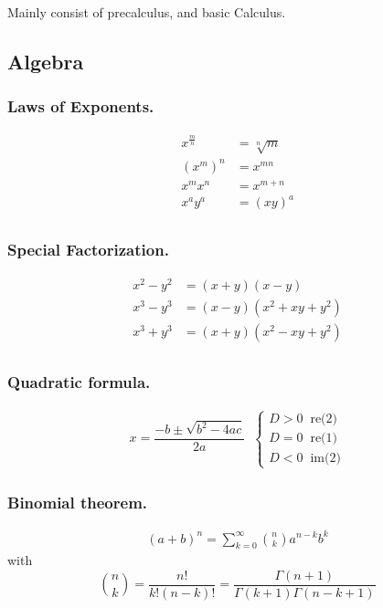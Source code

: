 \documentclass[../main.tex]{subfiles}
\begin{document}
Mainly consist of precalculus, and basic Calculus.
\subsection*{Algebra}
\subsubsection*{Laws of Exponents.}
\begin{align*}
    x^{\tfrac{m}{n}}&=\sqrt[n]{m}\\
    (x^m)^n&=x^{mn}\\
    x^mx^n&=x^{m+n}\\
    x^ay^a&=(xy)^a\\
\end{align*}

\subsubsection*{Special Factorization.}
\begin{align*}
    x^2-y^2&=(x+y)(x-y)\\
    x^3-y^3&=(x-y)(x^2+xy+y^2)\\
    x^3+y^3&=(x+y)(x^2-xy+y^2)\\
\end{align*}

\subsubsection*{Quadratic formula.}
\begin{align*}
    x=\dfrac{-b\pm \sqrt{b^2-4ac}}{2a}\;\;
    \begin{cases}
        D>0 \;\;\text{re(2)}\\
        D=0\;\;\text{re(1)}\\
        D<0\;\;\text{im(2)}
    \end{cases}
\end{align*}

\subsubsection*{Binomial theorem.}
\begin{align*}
    (a+b)^n=\sum_{k=0}^{\infty}\binom{n}{k}a^{n-k}b^{k}
\end{align*}
with
\begin{equation*}
    \binom{n}{k} = \frac{n!}{k!(n-k)!}=\frac{\Gamma (n+1)}{\Gamma(k+1)\Gamma(n-k+1)}
\end{equation*}
\end{document}
